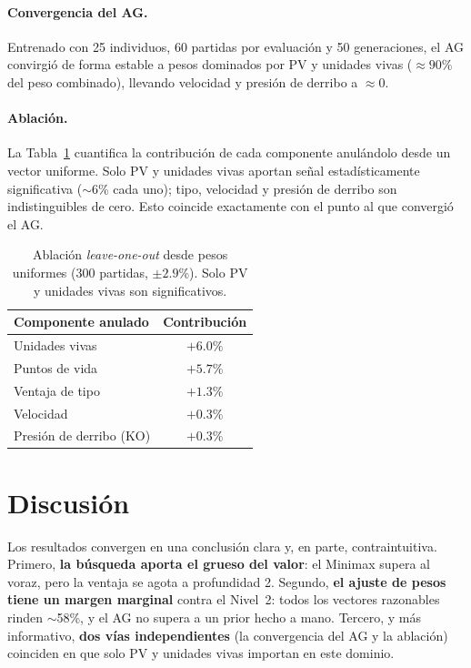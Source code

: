 \documentclass[11pt]{article}
\begin{document}
\paragraph{Convergencia del AG.} Entrenado con 25 individuos, 60 partidas por
evaluación y 50 generaciones, el AG convirgió de forma estable a pesos dominados
por PV y unidades vivas ($\approx 90\%$ del peso combinado), llevando velocidad y
presión de derribo a $\approx 0$.

\paragraph{Ablación.} La Tabla~\ref{tab:ablacion} cuantifica la contribución de
cada componente anulándolo desde un vector uniforme. Solo PV y unidades vivas
aportan señal estadísticamente significativa ($\sim 6\%$ cada uno); tipo,
velocidad y presión de derribo son indistinguibles de cero. Esto coincide
exactamente con el punto al que convergió el AG.

\begin{table}[t]
  \centering
  \begin{tabular}{lc}
    \hline
    \textbf{Componente anulado} & \textbf{Contribución} \\
    \hline
    Unidades vivas          & $+6.0\%$ \\
    Puntos de vida          & $+5.7\%$ \\
    Ventaja de tipo         & $+1.3\%$ \\
    Velocidad               & $+0.3\%$ \\
    Presión de derribo (KO) & $+0.3\%$ \\
    \hline
  \end{tabular}
  \caption{Ablación \emph{leave-one-out} desde pesos uniformes
  (300 partidas, $\pm 2.9\%$). Solo PV y unidades vivas son significativos.}
  \label{tab:ablacion}
\end{table}

\section{Discusión}
\label{sec:discusion}

Los resultados convergen en una conclusión clara y, en parte, contraintuitiva.
Primero, \textbf{la búsqueda aporta el grueso del valor}: el Minimax supera al
voraz, pero la ventaja se agota a profundidad 2. Segundo, \textbf{el ajuste de
pesos tiene un margen marginal} contra el Nivel~2: todos los vectores razonables
rinden $\sim$58\%, y el AG no supera a un prior hecho a mano. Tercero, y más
informativo, \textbf{dos vías independientes} (la convergencia del AG y la
ablación) coinciden en que solo PV y unidades vivas importan en este dominio.
\end{document}
